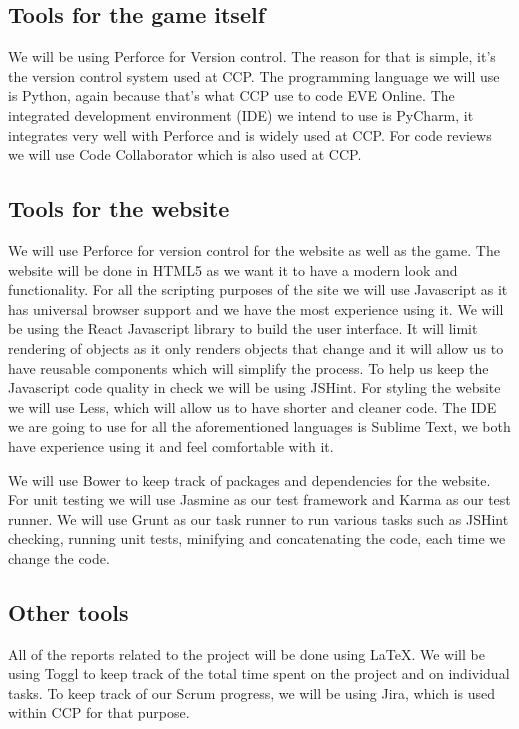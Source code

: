 \documentclass[11pt]{article}
\begin{document}
\subsection*{Tools for the game itself}
We will be using Perforce for Version control. The reason for that is simple, it's the version control system used at CCP. The programming language we will use is Python, again because that's what CCP use to code EVE Online. The integrated development environment (IDE) we intend to use is PyCharm, it integrates very well with Perforce and is widely used at CCP. For code reviews we will use Code Collaborator which is also used at CCP.

\subsection*{Tools for the website}
We will use Perforce for version control for the website as well as the game. The website will be done in HTML5 as we want it to have a modern look and functionality. For all the scripting purposes of the site we will use Javascript as it has universal browser support and we have the most experience using it. We will be using the React Javascript library to build the user interface. It will limit rendering of objects as it only renders objects that change and it will allow us to have reusable components which will simplify the process. To help us keep the Javascript code quality in check we will be using JSHint. For styling the website we will use Less, which will allow us to have shorter and cleaner code. The IDE we are going to use for all the aforementioned languages is Sublime Text, we both have experience using it and feel comfortable with it. 

We will use Bower to keep track of packages and dependencies for the website. For unit testing we will use Jasmine as our test framework and Karma as our test runner. We will use Grunt as our task runner to run various tasks such as JSHint checking, running unit tests, minifying and concatenating the code, each time we change the code.

\subsection*{Other tools}

All of the reports related to the project will be done using \LaTeX. We will be using Toggl to keep track of the total time spent on the project and on individual tasks. To keep track of our Scrum progress, we will be using Jira, which is used within CCP for that purpose.
\end{document}
